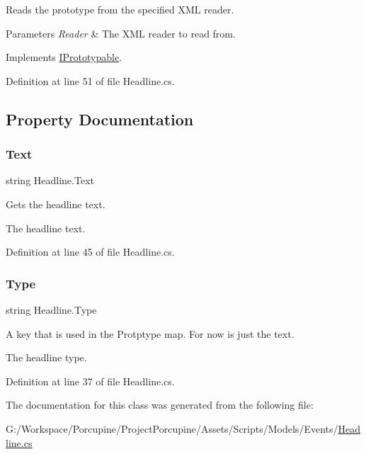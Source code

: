 Reads the prototype from the specified X\+ML reader. 


\begin{DoxyParams}{Parameters}
{\em Reader} & The X\+ML reader to read from.\\
\hline
\end{DoxyParams}


Implements \hyperlink{interface_i_prototypable_a024d752c4be655a7166db5718f1fad6a}{I\+Prototypable}.



Definition at line 51 of file Headline.\+cs.



\subsection{Property Documentation}
\mbox{\label{class_headline_abb34627258821c45a21d1dbae3ad76af}} 
\subsubsection{\texorpdfstring{Text}{Text}}
{\footnotesize\ttfamily string Headline.\+Text\hspace{0.3cm}{\ttfamily [get]}}



Gets the headline text. 

The headline text.

Definition at line 45 of file Headline.\+cs.

\mbox{\label{class_headline_a5de42ed76f528326548dbd3b82141912}} 
\subsubsection{\texorpdfstring{Type}{Type}}
{\footnotesize\ttfamily string Headline.\+Type\hspace{0.3cm}{\ttfamily [get]}}



A key that is used in the Protptype map. For now is just the text. 

The headline type.

Definition at line 37 of file Headline.\+cs.



The documentation for this class was generated from the following file\+:\begin{DoxyCompactItemize}
\item 
G\+:/\+Workspace/\+Porcupine/\+Project\+Porcupine/\+Assets/\+Scripts/\+Models/\+Events/\hyperlink{_headline_8cs}{Headline.\+cs}\end{DoxyCompactItemize}
